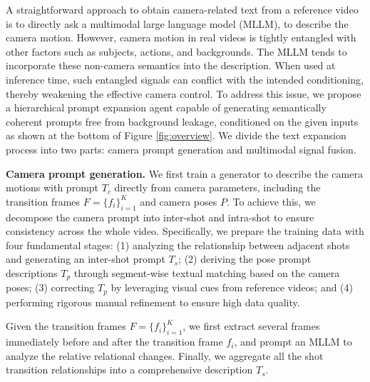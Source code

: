 \documentclass{llmxive}
\begin{document}
A straightforward approach to obtain camera-related text from a reference video is to directly ask a multimodal large language model  (MLLM), to describe the camera motion. However, camera motion in real videos is tightly entangled with other factors such as subjects, actions, and backgrounds. The MLLM tends to incorporate these non-camera semantics into the description. When used at inference time, such entangled signals can conflict with the intended conditioning, thereby weakening the effective camera control. To address this issue, we propose a hierarchical prompt expansion agent capable of generating semantically coherent prompts free from background leakage, conditioned on the given inputs as shown at the bottom of Figure \ref{fig:overview}. We divide the text expansion process into two parts: camera prompt generation and multimodal signal fusion.

\textbf{Camera prompt generation.} We first train a generator to describe the camera motions with prompt $T_c$ directly from camera parameters, including the transition frames $F=\{f_i\}_{i=1}^{K}$ and camera poses $P$. To achieve this, we decompose the camera prompt into inter-shot and intra-shot to ensure consistency across the whole video.  Specifically, we prepare the training data with four fundamental stages: (1) analyzing the relationship between adjacent shots and generating an inter-shot prompt $T_s$; (2) deriving the pose prompt descriptions $T_p$ through segment-wise textual matching based on the camera poses; (3) correcting $T_p$ by leveraging visual cues from reference videos; and (4) performing rigorous manual refinement to ensure high data quality.

Given the transition frames $F=\{f_i\}_{i=1}^{K}$, we first extract several frames immediately before and after the transition frame $f_i$, and prompt an MLLM to analyze the relative relational changes. Finally, we aggregate all the shot transition relationships into a comprehensive description $T_s$.
\end{document}
